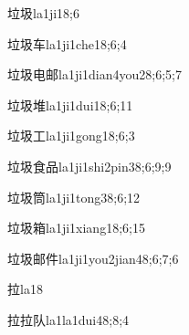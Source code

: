
\begin{verbete}{垃圾}{la1ji1}{8;6}
\end{verbete}

\begin{verbete}{垃圾车}{la1ji1che1}{8;6;4}
\end{verbete}

\begin{verbete}{垃圾电邮}{la1ji1dian4you2}{8;6;5;7}
\end{verbete}

\begin{verbete}{垃圾堆}{la1ji1dui1}{8;6;11}
\end{verbete}

\begin{verbete}{垃圾工}{la1ji1gong1}{8;6;3}
\end{verbete}

\begin{verbete}{垃圾食品}{la1ji1shi2pin3}{8;6;9;9}
\end{verbete}

\begin{verbete}{垃圾筒}{la1ji1tong3}{8;6;12}
\end{verbete}

\begin{verbete}{垃圾箱}{la1ji1xiang1}{8;6;15}
\end{verbete}

\begin{verbete}{垃圾邮件}{la1ji1you2jian4}{8;6;7;6}
\end{verbete}

\begin{verbete}{拉}{la1}{8}
\end{verbete}

\begin{verbete}{拉拉队}{la1la1dui4}{8;8;4}
\end{verbete}

